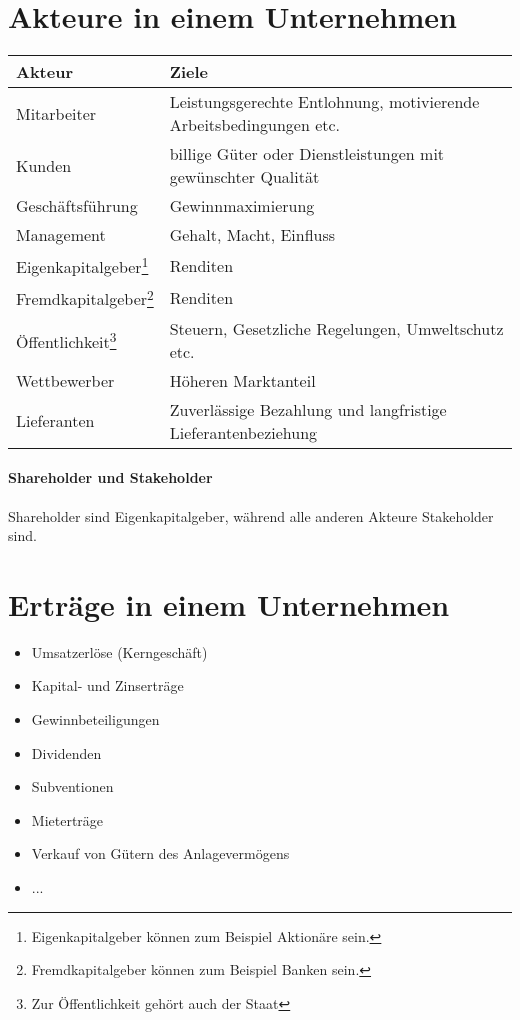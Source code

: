 \documentclass[../main.tex]{subfiles}
\begin{document}
    \section{Akteure in einem Unternehmen}    
        \begin{minipage}{12cm}
            \begin{tabular}{l l}
              Akteur & Ziele \\
              \hline
              Mitarbeiter & Leistungsgerechte Entlohnung, motivierende Arbeitsbedingungen etc. \\
              Kunden & billige Güter oder Dienstleistungen mit gewünschter Qualität \\
              Geschäftsführung & Gewinnmaximierung \\
              Management & Gehalt, Macht, Einfluss\\
              Eigenkapitalgeber\footnote{Eigenkapitalgeber können zum Beispiel Aktionäre sein.} & Renditen \\
              Fremdkapitalgeber\footnote{Fremdkapitalgeber können zum Beispiel Banken sein.} & Renditen\\
              Öffentlichkeit\footnote{Zur Öffentlichkeit gehört auch der Staat} & Steuern, Gesetzliche Regelungen, Umweltschutz etc.\\
              Wettbewerber & Höheren Marktanteil\\
              Lieferanten & Zuverlässige Bezahlung und langfristige Lieferantenbeziehung
            \end{tabular}
        \end{minipage}
        
        \paragraph{Shareholder und Stakeholder}
            Shareholder sind Eigenkapitalgeber, während alle anderen Akteure Stakeholder sind.
            
    \section{Erträge in einem Unternehmen}
        \begin{itemize}
            \item Umsatzerlöse (Kerngeschäft)
            \item Kapital- und Zinserträge
            \item Gewinnbeteiligungen
            \item Dividenden
            \item Subventionen
            \item Mieterträge
            \item Verkauf von Gütern des Anlagevermögens
            \item ...
        \end{itemize}
        
\end{document}
